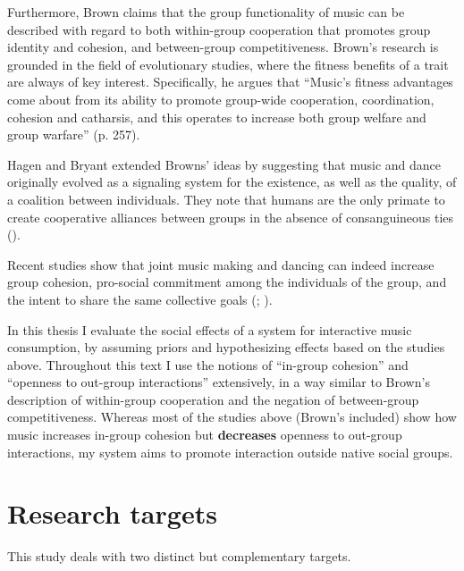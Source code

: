 \documentclass[a4paper,11pt]{article}
\begin{document}
Furthermore, Brown claims that the group functionality of music can be described with regard to both within-group cooperation that promotes group identity and cohesion, and between-group competitiveness.
Brown's research is grounded in the field of evolutionary studies, where the fitness benefits of a trait are always of key interest.
Specifically, he argues that ``Music's fitness advantages come about from its ability to promote group-wide cooperation, coordination, cohesion and catharsis, and this operates to increase both group welfare and group warfare'' (p. 257).

Hagen and Bryant extended Browns' ideas by suggesting that music and dance originally evolved as a signaling system for the existence, as well as the quality, of a coalition between individuals.
They note that humans are the only primate to create cooperative alliances between groups in the absence of consanguineous ties (\cite*{Hagen2003}).

Recent studies show that joint music making and dancing can indeed increase group cohesion, pro-social commitment among the individuals of the group, and the intent to share the same collective goals (\cite{Kirschner2010}; \cite{Knoblich2011}).

In this thesis I evaluate the social effects of a system for interactive music consumption, by assuming priors and hypothesizing effects based on the studies above.
Throughout this text I use the notions of ``in-group cohesion'' and ``openness to out-group interactions'' extensively, in a way similar to Brown's description of within-group cooperation and the negation of between-group competitiveness.
Whereas most of the studies above (Brown's included) show how music increases in-group cohesion but \textbf{decreases} openness to out-group interactions, my system aims to promote interaction outside native social groups.

\section{Research targets}

This study deals with two distinct but complementary targets.
\end{document}
